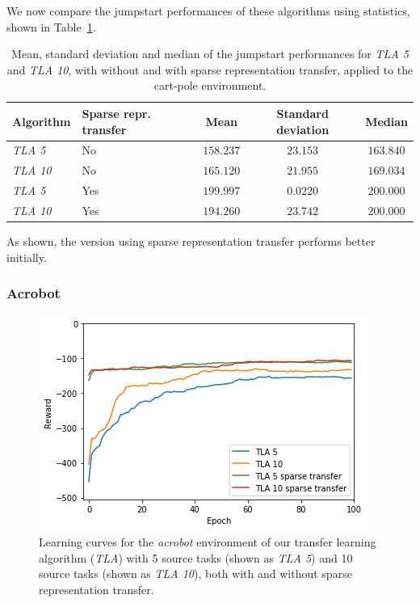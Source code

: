 We now compare the jumpstart performances of these algorithms using statistics, shown in Table~\ref{tab:cartpole:sparse:jumpstart:stats}.
\begin{table}[htb]
    \centering
    \begin{tabular}{llccc}
    \hline
    Algorithm & Sparse repr. transfer & Mean & Standard deviation & Median \\
    \hline
       \textit{TLA 5} & No & $158.237$ & $23.153$ & $163.840$ \\
       \textit{TLA 10} & No & $165.120$ & $21.955$ & $169.034$ \\
       \textit{TLA 5} & Yes & $\bm{199.997}$ & $0.0220$ & $\bm{200.000}$ \\
       \textit{TLA 10} & Yes & $194.260$ & $23.742$ & $\bm{200.000}$ \\
    \hline
    \end{tabular}
    \caption{Mean, standard deviation and median of the jumpstart performances for \textit{TLA 5} and \textit{TLA 10}, with without and with sparse representation transfer, applied to the cart-pole environment.}
    \label{tab:cartpole:sparse:jumpstart:stats}
\end{table}
As shown, the version using sparse representation transfer performs better initially.

\subsubsection{Acrobot} %
\label{ssub:with_sparse_representation_transfer:acrobot}
\begin{figure}[htb]
    \centering
    \includegraphics[width=.8\linewidth]{images/results/Acrobot/sparse_transfer/reward_target_without_with.png}
    \caption[Learning curves for the \textit{acrobot} environment of \textit{TLA} with and without sparse representation transfer]{Learning curves for the \emph{acrobot} environment of our transfer learning algorithm (\textit{TLA}) with 5 source tasks (shown as \textit{TLA 5}) and 10 source tasks (shown as \textit{TLA 10}), both with and without sparse representation transfer.}
    \label{fig:Acrobot:st:reward_target_without-with}
\end{figure}

